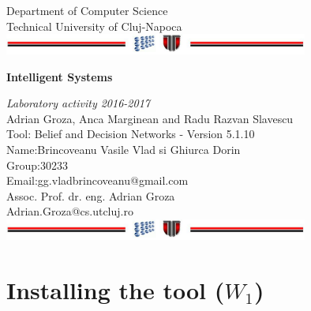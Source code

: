 \documentclass[a4paper,12pt]{report}
\begin{document}
\vspace{-5cm}
\begin{center}
Department of Computer Science\\
Technical University of Cluj-Napoca\\
\includegraphics[width=10cm]{fig/footer}
\end{center}
\vspace{1cm}
\begin{center}
\begin{Large}
\textbf{Intelligent Systems}\\
\end{Large}
\textit{Laboratory activity 2016-2017}\\
\vspace{3cm}
Adrian Groza, Anca Marginean and Radu Razvan Slavescu\\
Tool: Belief and Decision Networks - Version 5.1.10\\
\vspace{1.5cm}
Name:Brincoveanu Vasile Vlad si Ghiurca Dorin\\
Group:30233\\
Email:gg.vladbrincoveanu@gmail.com\\
\vspace{6cm}
Assoc. Prof. dr. eng. Adrian Groza\\
Adrian.Groza@cs.utcluj.ro\\
\vspace{1cm}
\includegraphics[width=10cm]{fig/footer}
\end{center}

\tableofcontents



\chapter{Installing the tool ($W_1$)}
\end{document}
